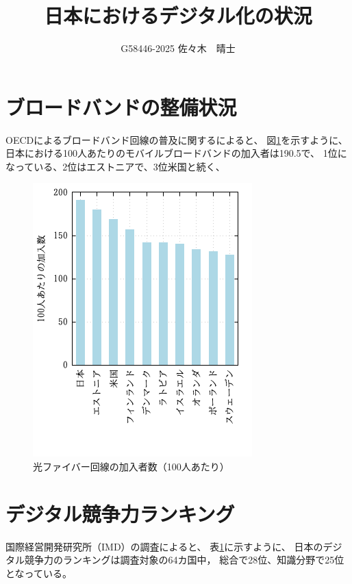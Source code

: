 \documentclass[a4paper,11pt,dvipdfmx]{ujarticle}
\title{日本におけるデジタル化の状況}
\author{G58446-2025 佐々木　晴士}
\begin{document}
\maketitle %

\section{ブロードバンドの整備状況}
OECDによるブロードバンド回線の普及に関する\cite{oecd}によると、
図\ref{fig:ブロードバンド}を示すように、
日本における100人あたりのモバイルブロードバンドの加入者は190.5で、
1位になっている、2位はエストニアで、3位米国と続く、

\begin{figure}[htbp]
    \centering
    \includegraphics{fig21.png}
    \caption{光ファイバー回線の加入者数（100人あたり）}\label{fig:ブロードバンド}
\end{figure}

\section{デジタル競争力ランキング}
国際経営開発研究所（IMD）の調査\cite{imd}によると、
表\ref{fig:ブロードバンド}に示すように、
日本のデジタル競争力のランキングは調査対象の64カ国中，
総合で28位、知識分野で25位となっている。
\end{document}
